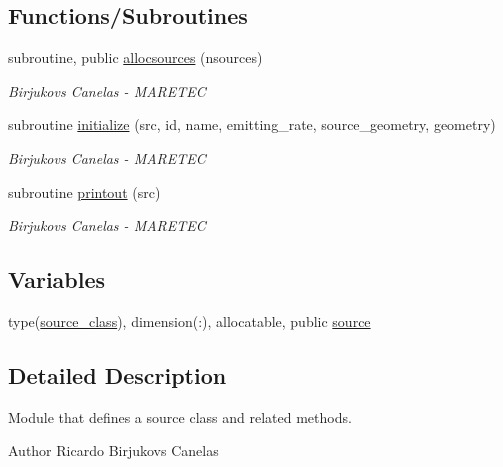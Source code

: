 \subsection*{Functions/\+Subroutines}
\begin{DoxyCompactItemize}
\item 
subroutine, public \mbox{\hyperlink{namespacesource__identity_a716b4cb4acec5756a6d4dcf20eee588e}{allocsources}} (nsources)
\begin{DoxyCompactList}\small\item\em Birjukovs Canelas -\/ M\+A\+R\+E\+T\+EC \end{DoxyCompactList}\item 
subroutine \mbox{\hyperlink{namespacesource__identity_a891e32a81b0e3c86d9de1971a4ca6501}{initialize}} (src, id, name, emitting\+\_\+rate, source\+\_\+geometry, geometry)
\begin{DoxyCompactList}\small\item\em Birjukovs Canelas -\/ M\+A\+R\+E\+T\+EC \end{DoxyCompactList}\item 
subroutine \mbox{\hyperlink{namespacesource__identity_a9715a7d707b4c80aa2d2ebd08712f6a9}{printout}} (src)
\begin{DoxyCompactList}\small\item\em Birjukovs Canelas -\/ M\+A\+R\+E\+T\+EC \end{DoxyCompactList}\end{DoxyCompactItemize}
\subsection*{Variables}
\begin{DoxyCompactItemize}
\item 
type(\mbox{\hyperlink{structsource__identity_1_1source__class}{source\+\_\+class}}), dimension(\+:), allocatable, public \mbox{\hyperlink{namespacesource__identity_a5ed8006613af7461c6a2ff1cdaeb8f0f}{source}}
\end{DoxyCompactItemize}


\subsection{Detailed Description}
Module that defines a source class and related methods. 

\begin{DoxyAuthor}{Author}
Ricardo Birjukovs Canelas 
\end{DoxyAuthor}


